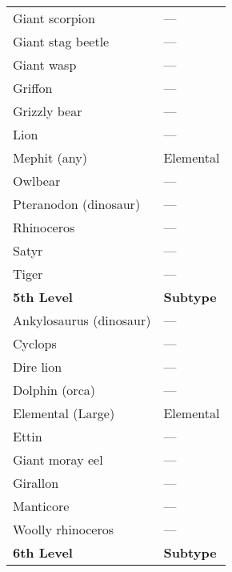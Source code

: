 \begin{tabular}{ll}
Giant scorpion                                & ---                \\
Giant stag beetle                             & ---                \\
Giant wasp                                    & ---                \\
Griffon                                       & ---                \\
Grizzly bear                                  & ---                \\
Lion                                          & ---                \\
Mephit (any)                                  & Elemental        \\
Owlbear                                       & ---                \\
Pteranodon (dinosaur)                         & ---                \\
Rhinoceros                                    & ---                \\
Satyr                                         & ---                \\
Tiger                                         & ---                \\
\textbf{5th Level}                            & \textbf{Subtype} \\
Ankylosaurus (dinosaur)                       & ---                \\
Cyclops                                       & ---                \\
Dire lion                                     & ---                \\
Dolphin (orca)                                & ---                \\
Elemental (Large)                             & Elemental        \\
Ettin                                         & ---                \\
Giant moray eel                               & ---                \\
Girallon                                      & ---                \\
Manticore                                     & ---                \\
Woolly rhinoceros                             & ---                \\
\textbf{6th Level}                            & \textbf{Subtype} \\

\end{tabular}
